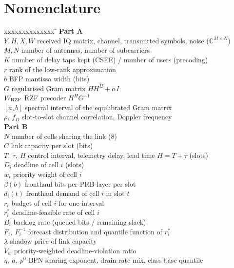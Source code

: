\documentclass[12pt,a4paper,oneside]{report}
\newcommand{\rstar}{r^{\ast}}
\theoremstyle{definition}
\begin{document}
\chapter*{Nomenclature}
\begin{tabbing}
xxxxxxxxxxxxxx \= \kill
\textbf{Part A}\\
$Y, H, X, W$ \> received IQ matrix, channel, transmitted symbols, noise ($\mathbb{C}^{M\times N}$)\\
$M, N$ \> number of antennas, number of subcarriers\\
$K$ \> number of delay taps kept (CSEE) / number of users (precoding)\\
$r$ \> rank of the low-rank approximation\\
$b$ \> BFP mantissa width (bits)\\
$G$ \> regularised Gram matrix $HH^H + \alpha I$\\
$W_{\rm RZF}$ \> RZF precoder $H^H G^{-1}$\\
$[a,b]$ \> spectral interval of the equilibrated Gram matrix\\
$\rho,\ f_D$ \> slot-to-slot channel correlation, Doppler frequency\\[6pt]
\textbf{Part B}\\
$N$ \> number of cells sharing the link (8)\\
$C$ \> link capacity per slot (bits)\\
$T,\ \tau,\ H$ \> control interval, telemetry delay, lead time $H = T+\tau$ (slots)\\
$D_i$ \> deadline of cell $i$ (slots)\\
$w_i$ \> priority weight of cell $i$\\
$\beta(b)$ \> fronthaul bits per PRB-layer per slot\\
$d_i(t)$ \> fronthaul demand of cell $i$ in slot $t$\\
$r_i$ \> budget of cell $i$ for one interval\\
$\rstar_i$ \> deadline-feasible rate of cell $i$\\
$B_i$ \> backlog rate (queued bits / remaining slack)\\
$F_i,\ F_i^{-1}$ \> forecast distribution and quantile function of $\rstar_i$\\
$\lambda$ \> shadow price of link capacity\\
$V_w$ \> priority-weighted deadline-violation ratio\\
$\eta,\ a,\ p^0$ \> BPN sharing exponent, drain-rate mix, class base quantile
\end{tabbing}

\cleardoublepage
{}
\setcounter{page}{1}










\appendix
{}



\end{document}
